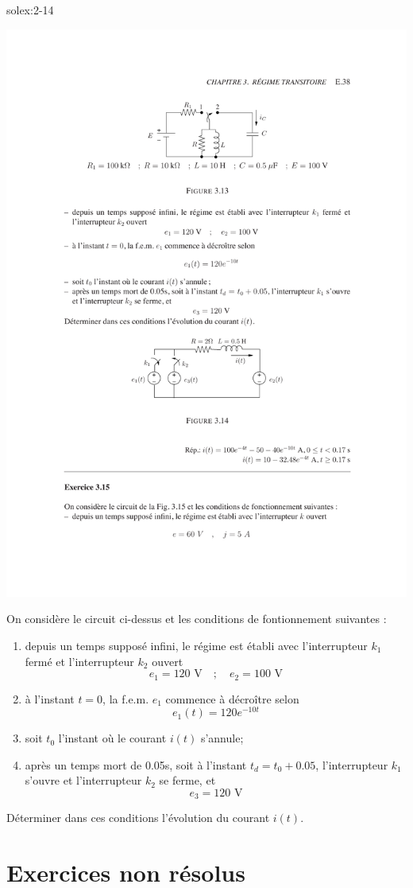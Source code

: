 \begin{exwithsol}{}{solex:2-14}
	\label{ex:2-14}
	\begin{center}
		\includegraphics[width=0.6\linewidth]{exercices/ex-3-14}
	\end{center}
	
	On consid\`ere le circuit ci-dessus et les conditions de
	fontionnement suivantes :
	\begin{enumerate}
		\item depuis un temps suppos\'e infini, le r\'egime est \'etabli avec
		l'interrupteur $k_1$ ferm\'e et l'interrupteur $k_2$ ouvert
		\[e_1=120\mbox{~V}\quad;\quad e_2=100\mbox{~V}\]
		\item \`a l'instant $t=0$, la f.e.m. $e_1$ commence \`a d\'ecro\^itre selon
		\[e_1(t)=120e^{-10t}\]
		\item soit $t_0$ l'instant o\`u le courant $i(t)$ s'annule;
		\item apr\`es un temps mort de 0.05s, soit \`a l'instant $t_d=t_0+0.05$,
		l'interrupteur $k_1$ s'ouvre et l'interrupteur $k_2$ se ferme, et
		\[e_3=120 \mbox{~V}\]
	\end{enumerate}
	D\'eterminer dans ces conditions l'\'evolution du courant $i(t)$.
	
\end{exwithsol}

\section{Exercices non r\'esolus}

